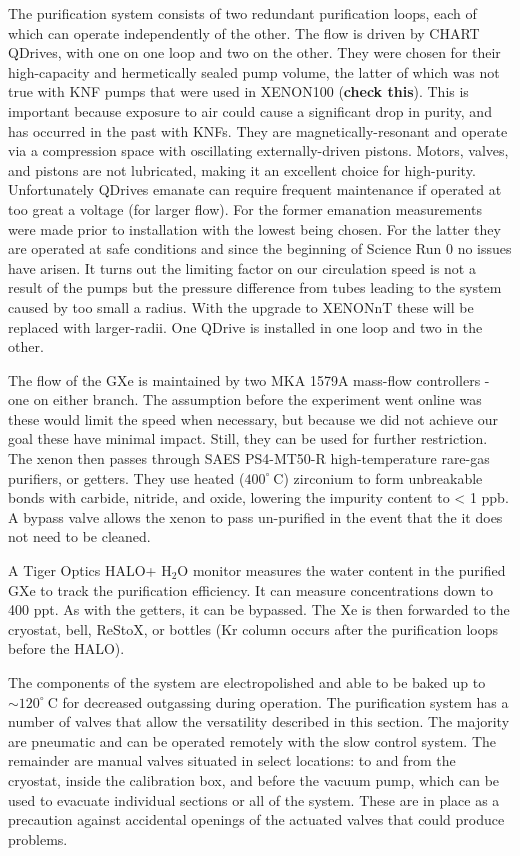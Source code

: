 The purification system consists of two redundant purification loops, each of which can operate independently of the other.  The flow
is driven by CHART QDrives, with one on one loop and two on the other.  They were chosen for their high-capacity and hermetically sealed
pump volume, the latter of which was not true with KNF pumps that were used in XENON100 (\textbf{check this}).  This is important because
exposure to air could cause a significant drop in purity, and has occurred in the past with KNFs.  They are
magnetically-resonant and operate via a compression space with oscillating externally-driven pistons.  Motors, valves, and pistons are
not lubricated, making it an excellent choice for high-purity.  Unfortunately QDrives emanate  can require frequent
maintenance if operated at too great a voltage (for larger flow).  For the former  emanation measurements were made prior to
installation with the lowest being chosen.  For the latter they are operated at safe conditions and since the beginning of Science Run 0
no issues have arisen.  It turns out the limiting factor on our circulation speed is not a result of the pumps but the pressure difference
from tubes leading to the system caused by too small a radius.  With the upgrade to XENONnT these will be replaced with larger-radii.  One
QDrive is installed in one loop and two in the other.

The flow of the GXe is maintained by two MKA 1579A mass-flow controllers - one on either branch.  The assumption before the experiment went
online was these would limit the speed when necessary, but because we did not achieve our goal these have minimal impact.  Still, they can
be used for further restriction.  The xenon then passes through SAES PS4-MT50-R high-temperature rare-gas purifiers, or getters.  They
use heated ($400^{\circ}\ \mathrm{C}$) zirconium to form unbreakable bonds with carbide, nitride, and oxide, lowering the impurity content
to < 1 ppb.  A bypass valve allows the xenon to pass un-purified in the event that the it does not need to be cleaned.

A Tiger Optics HALO+ H$_2$O monitor measures the water content in the purified GXe to track the purification efficiency.  It can measure
concentrations down to 400 ppt.  As with the getters, it can be bypassed.  The Xe is then forwarded to the cryostat, bell, ReStoX, or
bottles (Kr column occurs after the purification loops before the HALO).

The components of the system are electropolished and able to be baked up to ${\sim} 120^{\circ}\ \mathrm{C}$ for decreased outgassing during
operation.  The purification system has a number of valves that allow the versatility described in this section.  The majority are pneumatic and can
be operated remotely with the slow control system.  The remainder are manual valves situated in select locations: to and from the cryostat,
inside the calibration box, and before the vacuum pump, which can be used to evacuate individual sections or all of the system.  These are
in place as a precaution against accidental openings of the actuated valves that could produce problems.


